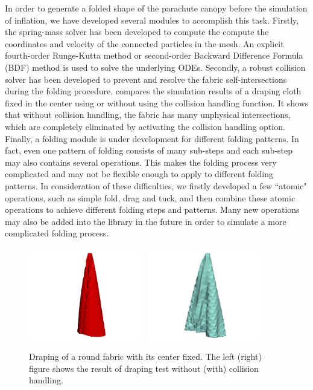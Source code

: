 In order to generate a folded shape of the parachute canopy before the simulation of inflation, we have developed several modules to accomplish this task. Firstly, the spring-mass solver has been developed to compute the compute the coordinates and velocity of the connected particles in the mesh. An explicit fourth-order Runge-Kutta method or second-order Backward Difference Formula (BDF) method is used to solve the underlying ODEs. Secondly, a robust collision solver has been developed to prevent and resolve the fabric self-intersections during the folding procedure.  compares the simulation results of a draping cloth fixed in the center using or without using the collision handling function. It shows that without collision handling, the fabric has many unphysical intersections, which are completely eliminated by activating the collision handling option. Finally, a folding module is under development for different folding patterns. In fact, even one pattern of folding consists of many sub-steps and each sub-step may also contains several operations. This makes the folding process very complicated and may not be flexible enough to apply to different folding patterns. In consideration of these difficulties, we firstly developed a few ``atomic" operations, such as simple fold, drag and tuck, and then combine these atomic operations to achieve different folding steps and patterns. Many new operations may also be added into the library in the future in order to simulate a more complicated folding process.

\begin{figure}[!htbp]
\includegraphics[width=0.45\textwidth]{Figures/drape_front_wocd.jpg}
\includegraphics[width=0.45\textwidth]{Figures/drape_front_wicd.jpg}
\caption{Draping of a round fabric with its center fixed. The left (right) figure shows the result of draping test without (with) collision handling.}
\label{fabric_drape_compare}
\end{figure}

